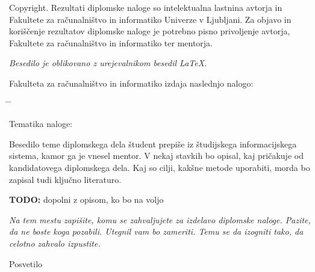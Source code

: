 \documentclass[a4paper, 12pt]{book}
\newcommand{\clearemptydoublepage}{\newpage{\pagestyle{empty}\cleardoublepage}}
\begin{document}
\noindent
{\sc Copyright}. 
Rezultati diplomske naloge so intelektualna lastnina avtorja in Fakultete za računalništvo in informatiko Univerze v Ljubljani.
Za objavo in koriščenje rezultatov diplomske naloge je potrebno pisno privoljenje avtorja, Fakultete za računalništvo in informatiko ter mentorja.

\begin{center}
\mbox{}\vfill
\emph{Besedilo je oblikovano z urejevalnikom besedil \LaTeX.}
\end{center}
\clearemptydoublepage

\thispagestyle{empty}
\vspace*{4cm}

\noindent
Fakulteta za računalništvo in informatiko izdaja naslednjo nalogo:
\medskip
\begin{tabbing}
\hspace{32mm}\= \hspace{6cm} \= \kill




Tematika naloge:
\end{tabbing}
Besedilo teme diplomskega dela študent prepiše iz študijskega informacijskega sistema, kamor ga je vnesel mentor. V nekaj stavkih bo opisal, kaj pričakuje od kandidatovega diplomskega dela. Kaj so cilji, kakšne metode uporabiti, morda bo zapisal tudi ključno literaturo.

\textbf{TODO:} dopolni z opisom, ko bo na voljo
\vspace{15mm}



\vspace{2cm}

\clearemptydoublepage

\thispagestyle{empty}\mbox{}\vfill\null\it%
\noindent
Na tem mestu zapišite, komu se zahvaljujete za izdelavo diplomske naloge. Pazite, da ne boste koga pozabili. Utegnil vam bo zameriti. Temu se da izogniti tako, da celotno zahvalo izpustite.
\rm\normalfont

\clearemptydoublepage

\thispagestyle{empty}\mbox{}{\textheight}\mbox{}\hfill\begin{minipage}{0.55\textwidth}%
Posvetilo
\normalfont\end{minipage}
\end{document}
